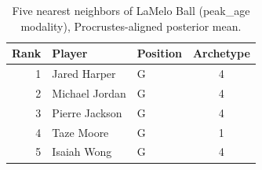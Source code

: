 \begin{table}[htbp]
  \centering\small
  \begin{tabular}{rllc}
    \toprule
    Rank & Player & Position & Archetype \\
    \midrule
    1 & Jared Harper & G & 4 \\
    2 & Michael Jordan & G & 4 \\
    3 & Pierre Jackson & G & 4 \\
    4 & Taze Moore & G & 1 \\
    5 & Isaiah Wong & G & 4 \\
    \bottomrule
  \end{tabular}
  \caption{Five nearest neighbors of LaMelo Ball (peak_age modality), Procrustes-aligned posterior mean.}
  \label{tab:LaMelo_Ball_neighbors_peak_age}
\end{table}

